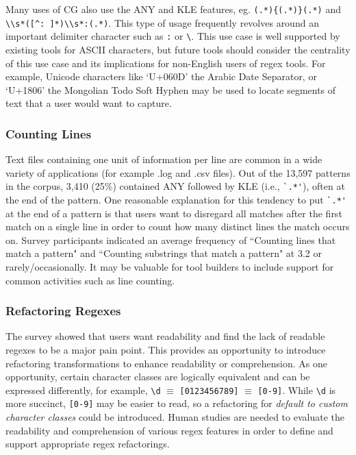 Many uses of CG also use the ANY and KLE features, eg. \verb!(.*){(.*)}(.*)! and \verb!\\s*([^: ]*)\\s*:(.*)!.  This type of usage frequently revolves around an important delimiter character such as \verb!:! or \verb!\!.  This use case is well supported by existing tools for ASCII characters, but future tools should consider the centrality of this use case and its implications for non-English users of regex tools.  For example, Unicode characters like `U+060D' the Arabic Date Separator, or `U+1806' the Mongolian Todo Soft Hyphen may be used to locate segments of text that a user would want to capture.


\subsubsection{Counting Lines}
Text files containing one unit of information per line are common in a wide variety of applications (for example .log and .csv files).  Out of the 13,597 patterns in the corpus, 3,410 (25\%) contained ANY followed by KLE  (i.e., \verb!`.*'!), often at the end of the pattern.
One reasonable explanation for this tendency to put \verb!`.*'! at the end of a pattern is that users want to disregard all matches after the first match on a single line in order to count how many distinct lines the match occurs on.  Survey participants indicated an average frequency of ``Counting lines that match a pattern" and ``Counting substrings that match a pattern" at 3.2 or rarely/occasionally. It may be valuable for tool builders to include support for common activities such as line counting.


\subsubsection{Refactoring Regexes}
The survey showed that users want readability and find the lack of readable regexes to be a major pain point.
This provides an opportunity to introduce refactoring transformations to enhance readability or comprehension.
As one opportunity, certain character classes are logically equivalent and can be expressed differently, for example, \verb!\d! $\equiv$ \verb![0123456789]! $\equiv$ \verb![0-9]!. While \verb!\d! is more succinct, \verb![0-9]! may be easier to read, so a refactoring for \emph{default to custom character classes} could be introduced.
Human studies are needed to evaluate the readability and comprehension of various regex features in order to define and support appropriate regex refactorings.

